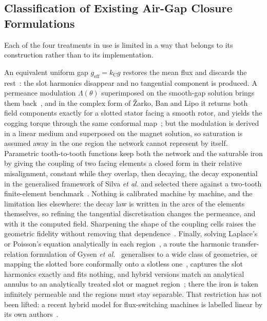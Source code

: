 \documentclass[10pt,a4paper,twocolumn]{article}
\theoremstyle{plain}
\theoremstyle{remark}
\begin{document}
\subsection{Classification of Existing Air-Gap Closure Formulations}
\label{sub:positioning}

Each of the four treatments in use is limited in a way that belongs to
its construction rather than to its implementation.

An equivalent uniform gap $g_{\mathrm{eff}}=k_{\mathrm{C}}g$ restores
the mean flux and discards the rest~\cite{carter,pyrhonen}: the slot
harmonics disappear and no tangential component is produced. A permeance
modulation $\Lambda(\theta)$ superimposed on the smooth-gap solution
brings them back~\cite{zhu1993}, and in the complex form of
\v{Z}arko, Ban and Lipo it returns both field components exactly for a
slotted stator facing a smooth rotor, and yields the cogging torque
through the same conformal map~\cite{zarko2006b,zarko2008}; but the
modulation is derived in a linear medium and superposed on the magnet
solution, so saturation is assumed away in the one region the network
cannot represent by itself. Parametric tooth-to-tooth functions keep
both the network and the saturable iron by giving the coupling of two
facing elements a closed form in their relative misalignment, constant
while they overlap, then decaying, the decay exponential in the
generalised framework of Silva \emph{et al.} and selected there against
a two-tooth finite-element benchmark~\cite{silva2023}. Nothing is
calibrated machine by machine, and the limitation lies elsewhere: the
decay law is written in the arcs of the elements themselves, so refining
the tangential discretisation changes the permeance, and with it the
computed field. Sharpening the shape of the coupling cells raises the
geometric fidelity without removing that dependence~\cite{ghods2022}.
Finally, solving Laplace's or Poisson's equation analytically in each
region~\cite{lubin2010,dubas}, a route the harmonic transfer-relation
formulation of Gysen \emph{et al.}~\cite{gysen2010} generalises to a wide
class of geometries, or mapping the slotted bore conformally
onto a slotless one~\cite{boughrara}, captures the slot harmonics
exactly and fits nothing, and hybrid versions match an analytical
annulus to an analytically treated slot or magnet
region~\cite{li2022,liuw2022}; there the iron is taken infinitely
permeable and the regions must stay separable. That restriction has not
been lifted: a recent hybrid model for flux-switching machines is
labelled linear by its own authors~\cite{zhao2023}.
\end{document}
